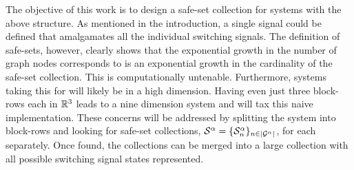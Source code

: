 The objective of this work is to design a safe-set collection for systems with the above structure. As mentioned in the introduction, a single signal could be defined that amalgamates all the individual switching signals. The definition of safe-sets, however, clearly shows that the exponential growth in the number of graph nodes corresponds to is an exponential growth in the cardinality of the safe-set collection. This is computationally untenable. Furthermore, systems taking this for will likely be in a high dimension. Having even just three block-rows each in $\mathbb{R}^3$ leads to a nine dimension system and will tax this naive implementation. These concerns will be addressed by splitting the system into block-rows and looking for safe-set collections, $\mathcal{S}^{\agentidx}=\{\mathcal{S}^\agentidx_n\}_{n\in\gnumnodes[\agentidx]}$, for each separately. Once found, the collections can be merged into a large collection with all possible switching signal states represented.

